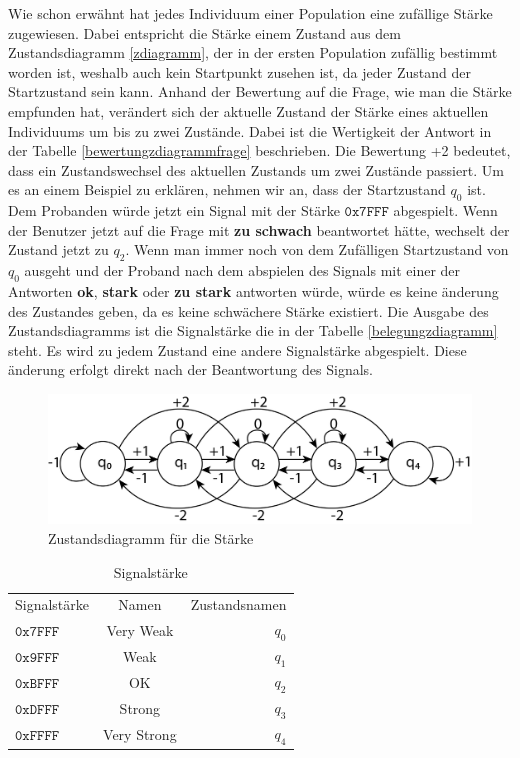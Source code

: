 Wie schon erw{\"a}hnt hat jedes Individuum einer Population eine zuf{\"a}llige St{\"a}rke zugewiesen.
Dabei entspricht die St{\"a}rke einem Zustand aus dem Zustandsdiagramm \autoref{zdiagramm}, der in der ersten Population zuf{\"a}llig bestimmt worden ist, weshalb auch kein Startpunkt zusehen ist, da jeder Zustand der Startzustand sein kann. Anhand der Bewertung auf die Frage, wie man die St{\"a}rke empfunden hat, ver{\"a}ndert sich der aktuelle Zustand der St{\"a}rke eines aktuellen Individuums um bis zu zwei Zust{\"a}nde. Dabei ist die Wertigkeit der Antwort in der Tabelle \autoref{bewertungzdiagrammfrage} beschrieben. 
Die Bewertung +2 bedeutet, dass ein Zustandswechsel des aktuellen Zustands um zwei Zust{\"a}nde passiert. 
Um es an einem Beispiel zu erkl{\"a}ren, nehmen wir an, dass der Startzustand $q_{0}$ ist. Dem Probanden w{\"u}rde jetzt ein Signal mit der St{\"a}rke $\mathtt{0x7FFF}$ abgespielt. Wenn der Benutzer jetzt auf die Frage mit \textbf{zu schwach} beantwortet h{\"a}tte, wechselt der Zustand jetzt zu $q_{2}$. Wenn man immer noch von dem Zuf{\"a}lligen Startzustand von $q_{0}$ ausgeht und der Proband nach dem abspielen des Signals mit einer der Antworten \textbf{ok}, \textbf{stark} oder \textbf{zu stark} antworten w{\"u}rde, w{\"u}rde es keine {\"a}nderung des Zustandes geben, da es keine schw{\"a}chere St{\"a}rke existiert. Die Ausgabe des Zustandsdiagramms ist die Signalst{\"a}rke die in der Tabelle \autoref{belegungzdiagramm} steht. Es wird zu jedem Zustand eine andere Signalst{\"a}rke abgespielt. Diese {\"a}nderung erfolgt direkt nach der Beantwortung des Signals. 

\begin{figure}
	\centering
    \includegraphics[width=\textwidth]{pics/entwurf/zdiagramm3.png}
    \caption{Zustandsdiagramm f{\"u}r die St{\"a}rke}
    \label{fig:zdiagramm}
\end{figure}

\begin{table}[]
\centering
\caption{Signalst{\"a}rke}
\label{belegungzdiagramm}
\begin{tabular}{lcr}
  Signalst{\"a}rke & Namen & Zustandsnamen \\
  $\mathtt{0x7FFF}$ & Very Weak & $q_{0}$ \\
  $\mathtt{0x9FFF}$ & Weak & $q_{1}$ \\
  $\mathtt{0xBFFF}$ & OK & $q_{2}$ \\
  $\mathtt{0xDFFF}$ & Strong & $q_{3}$ \\
  $\mathtt{0xFFFF}$ & Very Strong & $q_{4}$ \\
\end{tabular}
\end{table}

